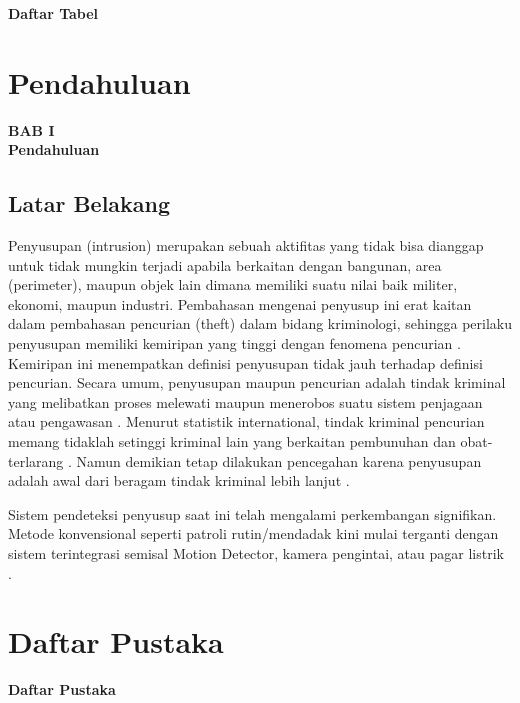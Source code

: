 \documentclass[12pt]{article}
\begin{document}
	\begin{center}
		\textbf{{\large Daftar Tabel}}
	\end{center}

\newpage
\thispagestyle{plain}
\mbox{}

\newpage


	\setcounter{section}{0}
	\section{Pendahuluan}
	
	\begin{center}
		{\large \textbf{BAB I}} \\
		{\large \textbf{Pendahuluan}}
	\end{center}
	
	\subsection{Latar Belakang}
	
	Penyusupan (intrusion) merupakan sebuah aktifitas yang tidak bisa dianggap untuk tidak mungkin terjadi apabila berkaitan dengan bangunan, area (perimeter), maupun objek lain dimana memiliki suatu nilai baik militer, ekonomi, maupun industri\cite{Assets}.
	Pembahasan mengenai penyusup ini erat kaitan dalam pembahasan pencurian (theft) dalam bidang kriminologi, sehingga perilaku penyusupan memiliki kemiripan yang tinggi dengan fenomena pencurian \cite{Felson1998}.
	Kemiripan ini menempatkan definisi penyusupan tidak jauh terhadap definisi pencurian. Secara umum, penyusupan maupun pencurian adalah tindak kriminal yang melibatkan proses melewati maupun menerobos suatu sistem penjagaan atau pengawasan \cite{Chapman}.
	Menurut statistik international, tindak kriminal pencurian memang tidaklah setinggi kriminal lain yang berkaitan pembunuhan dan obat-terlarang \cite{Frate2010}.
	Namun demikian tetap dilakukan pencegahan karena penyusupan adalah awal dari beragam tindak kriminal lebih lanjut \cite{Nesbit}.
	
	Sistem pendeteksi penyusup saat ini telah mengalami perkembangan signifikan.
	Metode konvensional seperti patroli rutin/mendadak kini mulai terganti dengan sistem terintegrasi semisal Motion Detector, kamera pengintai, atau pagar listrik \cite{AFL2011}.

\newpage

	\section{Daftar Pustaka}
	
	\begin{center}
		\textbf{Daftar Pustaka}
	\end{center}
	
	
	

	
\end{document}
